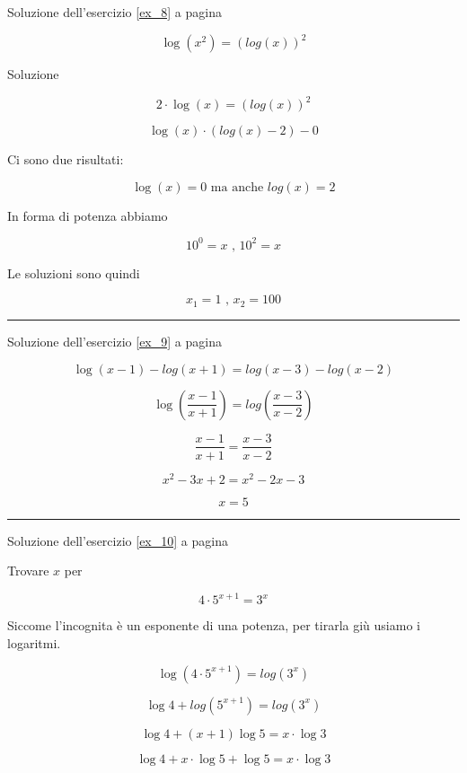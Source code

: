 \begin{minipage}{\textwidth}
Soluzione dell'esercizio \ref{ex_8} a pagina \pageref{ex_8}\label{sol_8}

\[
\log(x^2)=(log(x))^2 
\]

Soluzione

\[
2\cdot \log(x)=(log(x))^2 
\]

\[
\log(x)\cdot (log(x)-2)-0
\]

Ci sono due risultati:

\[
\log(x)=0\textrm{ ma anche }log(x)=2
\]

In forma di potenza abbiamo

\[
10^0=x \textrm{ , } 10^2=x
\]

Le soluzioni sono quindi

\[
x_1=1 \textrm{ , } x_2=100
\]

\end{minipage}



\vspace{1cm}
\hrule
\vspace{1cm}

Soluzione dell'esercizio \ref{ex_9} a pagina \pageref{ex_9}\label{sol_9}

\[
\log(x-1)-log(x+1)=log(x-3)-log(x-2)
\]

\[
\log\left(\frac{x-1}{x+1}\right)=log\left(\frac{x-3}{x-2}\right)
\]

\[
\frac{x-1}{x+1}=\frac{x-3}{x-2}
\]


\[
x^2-3x+2=x^2-2x-3
\]

\[
x=5
\]



\vspace{1cm}
\hrule
\vspace{1cm}

Soluzione dell'esercizio \ref{ex_10} a pagina \pageref{ex_10}\label{sol_10}


Trovare $x$ per 


\[
4\cdot 5^{x+1} = 3^x
\]

Siccome l'incognita è un esponente di una potenza, per tirarla giù usiamo i logaritmi.

\[
\log(4\cdot 5^{x+1}) = log(3^x)
\]

\[
\log 4+log(5^{x+1}) = log(3^x)
\]

\[
\log 4 +(x+1)\log5 = x\cdot \log3
\]

\[
\log4 +x\cdot \log5+\log5 = x\cdot \log3
\]

